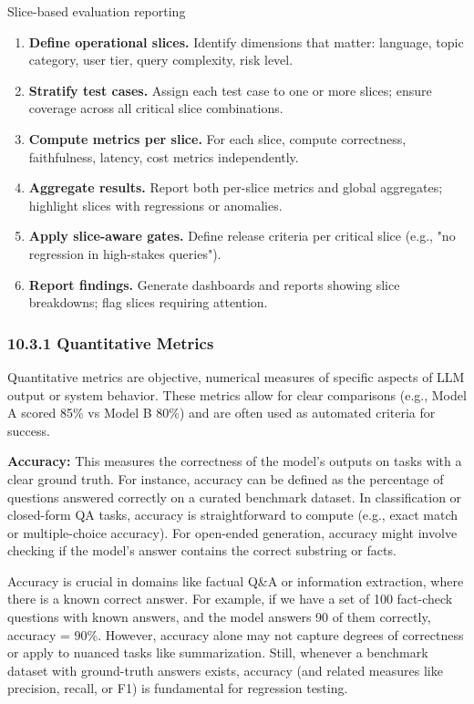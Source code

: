 \begin{llmalgobox}{Slice-based evaluation reporting}
\label{alg:ch10_slice_based_reporting}
\begin{enumerate}[leftmargin=1.6em, itemsep=3pt]
    \item \textbf{Define operational slices.} Identify dimensions that matter: language, topic category, user tier, query complexity, risk level.
    \item \textbf{Stratify test cases.} Assign each test case to one or more slices; ensure coverage across all critical slice combinations.
    \item \textbf{Compute metrics per slice.} For each slice, compute correctness, faithfulness, latency, cost metrics independently.
    \item \textbf{Aggregate results.} Report both per-slice metrics and global aggregates; highlight slices with regressions or anomalies.
    \item \textbf{Apply slice-aware gates.} Define release criteria per critical slice (e.g., "no regression in high-stakes queries").
    \item \textbf{Report findings.} Generate dashboards and reports showing slice breakdowns; flag slices requiring attention.
\end{enumerate}
\end{llmalgobox}

\subsubsection*{10.3.1 Quantitative Metrics}
Quantitative metrics are objective, numerical measures of specific aspects of LLM output or system behavior. These metrics allow for clear comparisons (e.g., Model A scored 85\% vs Model B 80\%) and are often used as automated criteria for success.  

\textbf{Accuracy:} This measures the correctness of the model’s outputs on tasks with a clear ground truth. For instance, accuracy can be defined as the percentage of questions answered correctly on a curated benchmark dataset. In classification or closed-form QA tasks, accuracy is straightforward to compute (e.g., exact match or multiple-choice accuracy). For open-ended generation, accuracy might involve checking if the model’s answer contains the correct substring or facts.  

Accuracy is crucial in domains like factual Q\&A or information extraction, where there is a known correct answer. For example, if we have a set of 100 fact-check questions with known answers, and the model answers 90 of them correctly, accuracy = 90\%. However, accuracy alone may not capture degrees of correctness or apply to nuanced tasks like summarization. Still, whenever a benchmark dataset with ground-truth answers exists, accuracy (and related measures like precision, recall, or F1) is fundamental for regression testing.  

